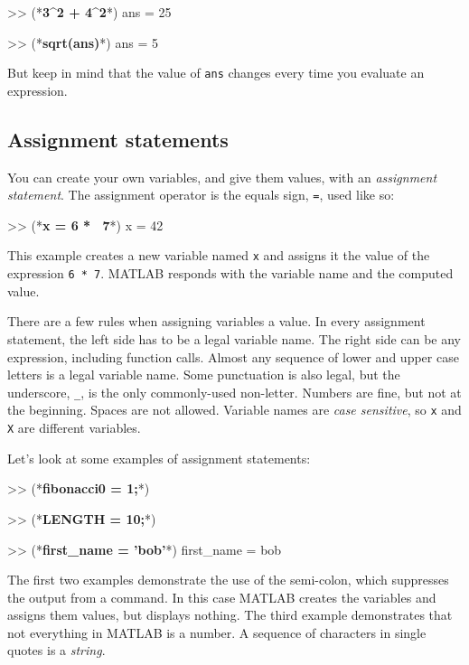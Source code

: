 \begin{code}
>> (*\textbf{3\^{}2 + 4\^{}2}*)
ans = 25

>> (*\textbf{sqrt(ans)}*)
ans = 5
\end{code}

But keep in mind that the value of \lstinline{ans} changes every time
you evaluate an expression.


\subsection{Assignment statements}

You can create your own variables, and give them values, with
an \emph{assignment statement}.  The assignment operator is the
equals sign, \lstinline{=}, used like so:


\begin{code}
>> (*\textbf{x = 6 * ~7}*)
x = 42
\end{code}

This example creates a new variable named \lstinline{x} and assigns it the
value of the expression \lstinline{6 * 7}.  MATLAB responds with the
variable name and the computed value.


There are a few rules when assigning variables a value. In every assignment statement, the left side has to be a legal variable name.  The right side can be any expression, including function calls.
Almost any sequence of lower and upper case letters is a legal
variable name.  
Some punctuation is also legal, but the underscore,
\verb"_", is the only commonly-used non-letter.
Numbers are fine, but not at the beginning.  
Spaces are not allowed.  Variable names are
\emph{case sensitive}, so \lstinline{x} and \lstinline{X} are different variables.

Let's look at some examples of assignment statements:

\begin{code}
>> (*\textbf{fibonacci0 = 1;}*)

>> (*\textbf{LENGTH = 10;}*)

>> (*\textbf{first\_name = 'bob'}*)
first_name = bob
\end{code}

The first two examples demonstrate the use of the semi-colon, which
suppresses the output from a command.  In this case MATLAB creates the
variables and assigns them values, but displays nothing.
The third example demonstrates that not everything
in MATLAB is a number.
A sequence of characters in single quotes is
a \emph{string}.

